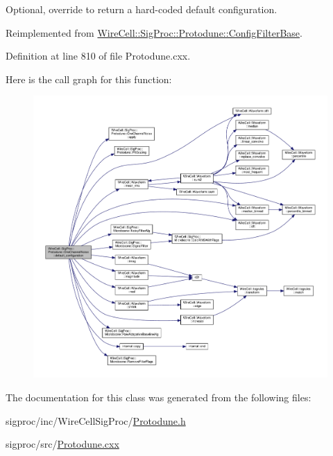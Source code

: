 Optional, override to return a hard-\/coded default configuration. 



Reimplemented from \hyperlink{class_wire_cell_1_1_sig_proc_1_1_protodune_1_1_config_filter_base_a68b71c244f3a6ade0320a43f1699f1c9}{Wire\+Cell\+::\+Sig\+Proc\+::\+Protodune\+::\+Config\+Filter\+Base}.



Definition at line 810 of file Protodune.\+cxx.

Here is the call graph for this function\+:
\nopagebreak
\begin{figure}[H]
\begin{center}
\leavevmode
\includegraphics[width=350pt]{class_wire_cell_1_1_sig_proc_1_1_protodune_1_1_one_channel_noise_a2f0a41f11d154f971da95d9127be594d_cgraph}
\end{center}
\end{figure}


The documentation for this class was generated from the following files\+:\begin{DoxyCompactItemize}
\item 
sigproc/inc/\+Wire\+Cell\+Sig\+Proc/\hyperlink{_protodune_8h}{Protodune.\+h}\item 
sigproc/src/\hyperlink{_protodune_8cxx}{Protodune.\+cxx}\end{DoxyCompactItemize}
